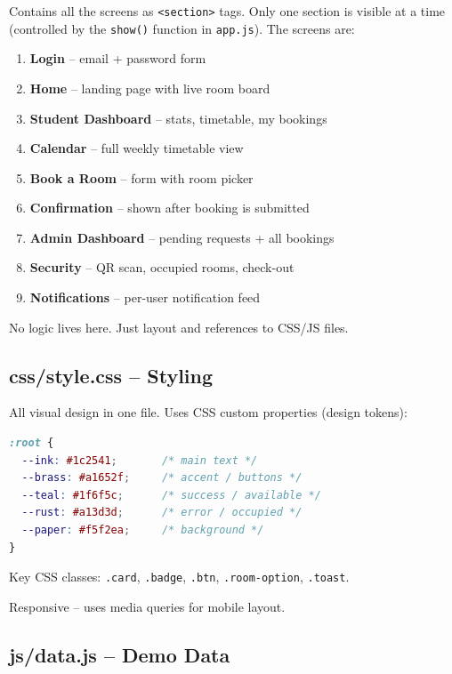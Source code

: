 \documentclass[12pt,a4paper]{article}
\begin{document}
Contains all the screens as \texttt{<section>} tags. Only one section is visible at a time (controlled by the \texttt{show()} function in \texttt{app.js}). The screens are:

\begin{enumerate}
  \item \textbf{Login} -- email + password form
  \item \textbf{Home} -- landing page with live room board
  \item \textbf{Student Dashboard} -- stats, timetable, my bookings
  \item \textbf{Calendar} -- full weekly timetable view
  \item \textbf{Book a Room} -- form with room picker
  \item \textbf{Confirmation} -- shown after booking is submitted
  \item \textbf{Admin Dashboard} -- pending requests + all bookings
  \item \textbf{Security} -- QR scan, occupied rooms, check-out
  \item \textbf{Notifications} -- per-user notification feed
\end{enumerate}

No logic lives here. Just layout and references to CSS/JS files.

\subsection{css/style.css -- Styling}

All visual design in one file. Uses CSS custom properties (design tokens):

\begin{lstlisting}[language=CSS]
:root {
  --ink: #1c2541;       /* main text */
  --brass: #a1652f;     /* accent / buttons */
  --teal: #1f6f5c;      /* success / available */
  --rust: #a13d3d;      /* error / occupied */
  --paper: #f5f2ea;     /* background */
}
\end{lstlisting}

Key CSS classes: \texttt{.card}, \texttt{.badge}, \texttt{.btn}, \texttt{.room-option}, \texttt{.toast}.

Responsive -- uses media queries for mobile layout.

\subsection{js/data.js -- Demo Data}
\end{document}
